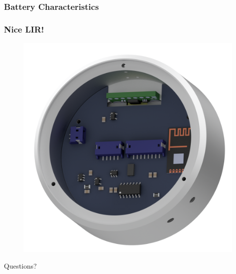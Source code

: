 \documentclass[mathserif]{beamer}
\begin{document}
\begin{frame}[t]\frametitle{Battery Characteristics}
    \begin{figure}[h]
		\centering
		
	\end{figure}
\end{frame}

\begin{frame}[c]\frametitle{Nice LIR!}
	\begin{figure}
	\centering
	\includegraphics[width=.7\linewidth]{graphics/joint_assembly}
	\end{figure}
\end{frame}

\begin{frame}[standout]
  Questions?
\end{frame}
\end{document}
